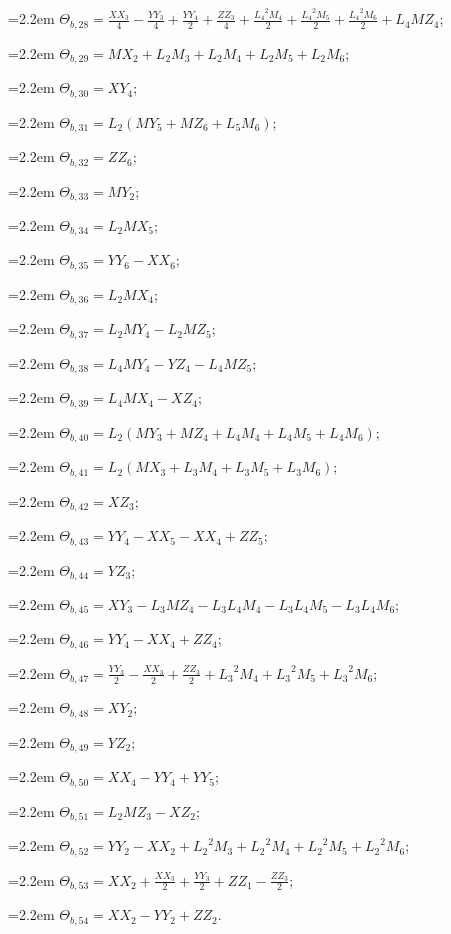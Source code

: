 {\hangindent=2.2em $\Theta_{b,28}=\tfrac{XX_{3}}{4}-\tfrac{YY_{3}}{4}+\tfrac{YY_{4}}{2}+\tfrac{ZZ_{3}}{4}+\tfrac{{L_{4}}^2M_{4}}{2}+\tfrac{{L_{4}}^2M_{5}}{2}+\tfrac{{L_{4}}^2M_{6}}{2}+L_{4}MZ_{4}$;\par
\hangindent=2.2em $\Theta_{b,29}=MX_{2}+L_{2}M_{3}+L_{2}M_{4}+L_{2}M_{5}+L_{2}M_{6}$;\par
\hangindent=2.2em $\Theta_{b,30}=XY_{4}$;\par
\hangindent=2.2em $\Theta_{b,31}=L_{2}(MY_{5}+MZ_{6}+L_{5}M_{6})$;\par
\hangindent=2.2em $\Theta_{b,32}=ZZ_{6}$;\par
\hangindent=2.2em $\Theta_{b,33}=MY_{2}$;\par
\hangindent=2.2em $\Theta_{b,34}=L_{2}MX_{5}$;\par
\hangindent=2.2em $\Theta_{b,35}=YY_{6}-XX_{6}$;\par
\hangindent=2.2em $\Theta_{b,36}=L_{2}MX_{4}$;\par
\hangindent=2.2em $\Theta_{b,37}=L_{2}MY_{4}-L_{2}MZ_{5}$;\par
\hangindent=2.2em $\Theta_{b,38}=L_{4}MY_{4}-YZ_{4}-L_{4}MZ_{5}$;\par
\hangindent=2.2em $\Theta_{b,39}=L_{4}MX_{4}-XZ_{4}$;\par
\hangindent=2.2em $\Theta_{b,40}=L_{2}(MY_{3}+MZ_{4}+L_{4}M_{4}+L_{4}M_{5}+L_{4}M_{6})$;\par
\hangindent=2.2em $\Theta_{b,41}=L_{2}(MX_{3}+L_{3}M_{4}+L_{3}M_{5}+L_{3}M_{6})$;\par
\hangindent=2.2em $\Theta_{b,42}=XZ_{3}$;\par
\hangindent=2.2em $\Theta_{b,43}=YY_{4}-XX_{5}-XX_{4}+ZZ_{5}$;\par
\hangindent=2.2em $\Theta_{b,44}=YZ_{3}$;\par
\hangindent=2.2em $\Theta_{b,45}=XY_{3}-L_{3}MZ_{4}-L_{3}L_{4}M_{4}-L_{3}L_{4}M_{5}-L_{3}L_{4}M_{6}$;\par
\hangindent=2.2em $\Theta_{b,46}=YY_{4}-XX_{4}+ZZ_{4}$;\par
\hangindent=2.2em $\Theta_{b,47}=\tfrac{YY_{3}}{2}-\tfrac{XX_{3}}{2}+\tfrac{ZZ_{3}}{2}+{L_{3}}^2M_{4}+{L_{3}}^2M_{5}+{L_{3}}^2M_{6}$;\par
\hangindent=2.2em $\Theta_{b,48}=XY_{2}$;\par
\hangindent=2.2em $\Theta_{b,49}=YZ_{2}$;\par
\hangindent=2.2em $\Theta_{b,50}=XX_{4}-YY_{4}+YY_{5}$;\par
\hangindent=2.2em $\Theta_{b,51}=L_{2}MZ_{3}-XZ_{2}$;\par
\hangindent=2.2em $\Theta_{b,52}=YY_{2}-XX_{2}+{L_{2}}^2M_{3}+{L_{2}}^2M_{4}+{L_{2}}^2M_{5}+{L_{2}}^2M_{6}$;\par
\hangindent=2.2em $\Theta_{b,53}=XX_{2}+\tfrac{XX_{3}}{2}+\tfrac{YY_{3}}{2}+ZZ_{1}-\tfrac{ZZ_{3}}{2}$;\par
\hangindent=2.2em $\Theta_{b,54}=XX_{2}-YY_{2}+ZZ_{2}$.\par
}
